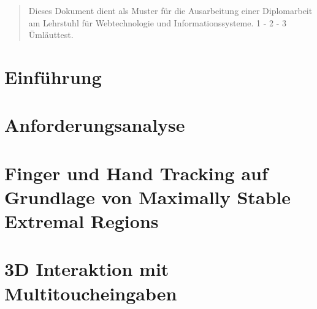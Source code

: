 \documentclass[pdftex,12pt,a4paper]{report}
\begin{document}

\deckblatt



\erklaerung



\begin{abstract}

Dieses Dokument dient als Muster für die Ausarbeitung einer Diplomarbeit
am Lehrstuhl für Webtechnologie und Informationssysteme. 
1 - 2 - 3 Ümläuttest.

\end{abstract}



\tableofcontents



\chapter{Einführung}
\label{chp:einfuehrung}



\chapter{Anforderungsanalyse}
\label{chp:anforderungsanalyse}



\chapter{Finger und Hand Tracking auf Grundlage von Maximally Stable Extremal Regions}
\label{chp:mser}



\chapter{3D Interaktion mit Multitoucheingaben}
\label{chp:interaktion_mit_multitoucheingaben}

\end{document}
